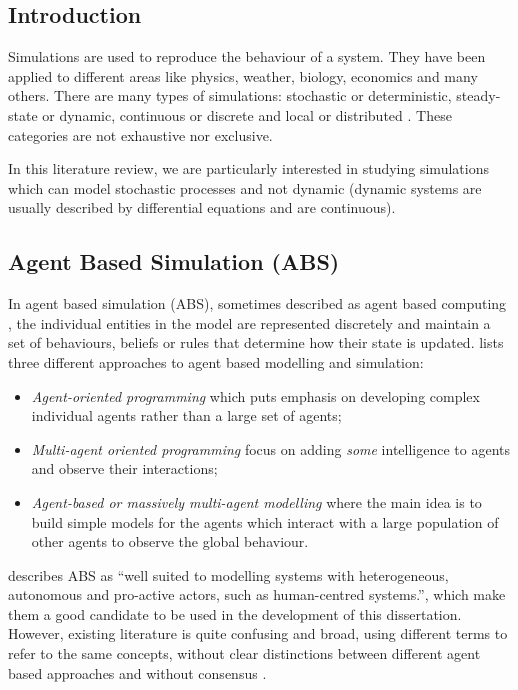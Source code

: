 \subsection{Introduction}

Simulations are used to reproduce the behaviour of a system. They have been 
applied to different areas like physics, weather, biology, economics and many 
others. There are many types of simulations: stochastic or deterministic, 
steady-state or dynamic, continuous or discrete and local or distributed 
\cite{WKSimulation}. These categories are not exhaustive nor exclusive.

In this literature review, we are particularly interested in studying 
simulations which can model stochastic processes and not dynamic (dynamic 
systems are usually described by differential equations and are continuous).

\subsection{Agent Based Simulation (ABS)}

In agent based simulation (ABS), sometimes described as agent based computing 
\cite{wooldridge1998agent, jennings1999agent}, the individual entities in the 
model are represented discretely and maintain a set of behaviours, beliefs or 
rules that determine how their state is updated. \cite{Niazi2011} lists three 
different approaches to agent based modelling and simulation:

\begin{itemize}
    \item \emph{Agent-oriented programming} which puts emphasis on developing 
    complex individual agents rather than a large set of agents;
    \item \emph{Multi-agent oriented programming} focus on adding \emph{some} 
    intelligence to agents and observe their interactions;
    \item \emph{Agent-based or massively multi-agent modelling} where the main 
    idea is to build simple models for the agents which interact with a large 
    population of other agents to observe the global behaviour.
\end{itemize}

\cite{Siebers2010} describes ABS as ``well suited to modelling systems with 
heterogeneous, autonomous and pro-active actors, such as human-centred 
systems.'', which make them a good candidate to be used in the development of 
this dissertation. However, existing literature is quite confusing and broad, 
using different terms to refer to the same concepts, without clear 
distinctions between different agent based approaches and without consensus 
\cite{Niazi2011, Brailsford2014}.

